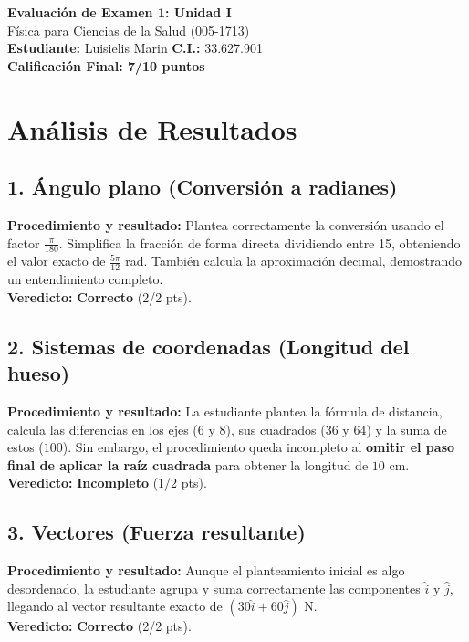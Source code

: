 \documentclass[12pt]{article}
\begin{document}
\begin{center}
    \Large \textbf{Evaluación de Examen 1: Unidad I} \\
    \large Física para Ciencias de la Salud (005-1713) \\
    \vspace{0.5cm}
    \textbf{Estudiante:} Luisielis Marin \quad \textbf{C.I.:} 33.627.901
    \vspace{0.3cm} \\
    \large \textbf{Calificación Final: 7/10 puntos}
\end{center}

\vspace{0.5cm}

\section*{Análisis de Resultados}

\subsection*{1. Ángulo plano (Conversión a radianes)}
\textbf{Procedimiento y resultado:} Plantea correctamente la conversión usando el factor $\frac{\pi}{180}$. Simplifica la fracción de forma directa dividiendo entre 15, obteniendo el valor exacto de $\frac{5\pi}{12}$ rad. También calcula la aproximación decimal, demostrando un entendimiento completo. \\
\textbf{Veredicto:} \textbf{Correcto} (2/2 pts).

\subsection*{2. Sistemas de coordenadas (Longitud del hueso)}
\textbf{Procedimiento y resultado:} La estudiante plantea la fórmula de distancia, calcula las diferencias en los ejes ($6$ y $8$), sus cuadrados ($36$ y $64$) y la suma de estos ($100$). Sin embargo, el procedimiento queda incompleto al \textbf{omitir el paso final de aplicar la raíz cuadrada} para obtener la longitud de $10$ cm. \\
\textbf{Veredicto:} \textbf{Incompleto} (1/2 pts).

\subsection*{3. Vectores (Fuerza resultante)}
\textbf{Procedimiento y resultado:} Aunque el planteamiento inicial es algo desordenado, la estudiante agrupa y suma correctamente las componentes $\hat{i}$ y $\hat{j}$, llegando al vector resultante exacto de $(30\hat{i} + 60\hat{j})$ N. \\
\textbf{Veredicto:} \textbf{Correcto} (2/2 pts).
\end{document}
